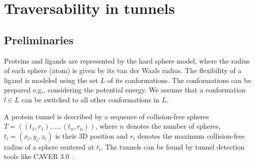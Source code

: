 \documentclass{svmult}
\def\probe{r_{\mathrm{probe}}}
\def\Sprobe{S_{\mathrm{probe}}}
\def\SS{\mathbf{S}}
\def\L{L}
\begin{document}
\section{Traversability in tunnels}

\subsection{Preliminaries}

Proteins and ligands are represented by the hard sphere model, where the radius of each sphere (atom) is given by its van der Waals radius.
The flexibility of a ligand is modeled using the set $\L$ of its conformations.
The conformations can be prepared e.g., considering the potential energy.
We assume that a conformation $l \in \L$ can be switched to all other conformations in $\L$.


A protein tunnel is described by a sequence of collision-free spheres 
$T=( (t_1, r_1),\ldots,(t_n,r_n) )$, where $n$ denotes the number of spheres,
$t_i=(x_i,y_i,z_i)$ is their 3D position and $r_i$ denotes the maximum collision-free radius of a sphere centered at $t_i$. 
The tunnels can be found by tunnel detection tools like CAVER 3.0~\cite{caver3}.

\end{document}

